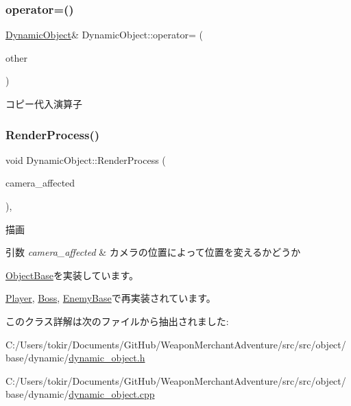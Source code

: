 \subsubsection{\texorpdfstring{operator=()}{operator=()}}
{\footnotesize\ttfamily \mbox{\hyperlink{class_dynamic_object}{Dynamic\+Object}}\& Dynamic\+Object\+::operator= (\begin{DoxyParamCaption}\item[{const \mbox{\hyperlink{class_dynamic_object}{Dynamic\+Object}} \&}]{other }\end{DoxyParamCaption})\hspace{0.3cm}{\ttfamily [inline]}}



コピー代入演算子 

\mbox{\label{class_dynamic_object_aa7488e1b4dfd7049447535d93d9d6783}} 
\subsubsection{\texorpdfstring{Render\+Process()}{RenderProcess()}}
{\footnotesize\ttfamily void Dynamic\+Object\+::\+Render\+Process (\begin{DoxyParamCaption}\item[{bool}]{camera\+\_\+affected }\end{DoxyParamCaption})\hspace{0.3cm}{\ttfamily [protected]}, {\ttfamily [virtual]}}



描画 


\begin{DoxyParams}{引数}
{\em camera\+\_\+affected} & カメラの位置によって位置を変えるかどうか \\
\hline
\end{DoxyParams}


\mbox{\hyperlink{class_object_base_aeac51d868beeb7f7fe900407b76b93a2}{Object\+Base}}を実装しています。



\mbox{\hyperlink{class_player_a8ac2e54fe5672d32186456b9735c02c3}{Player}}, \mbox{\hyperlink{class_boss_a6681bd6fc6dc35e200f9e63f196301af}{Boss}}, \mbox{\hyperlink{class_enemy_base_af874ce6fc410fddc7d55ffd7c7bedac8}{Enemy\+Base}}で再実装されています。



このクラス詳解は次のファイルから抽出されました\+:\begin{DoxyCompactItemize}
\item 
C\+:/\+Users/tokir/\+Documents/\+Git\+Hub/\+Weapon\+Merchant\+Adventure/src/src/object/base/dynamic/\mbox{\hyperlink{dynamic__object_8h}{dynamic\+\_\+object.\+h}}\item 
C\+:/\+Users/tokir/\+Documents/\+Git\+Hub/\+Weapon\+Merchant\+Adventure/src/src/object/base/dynamic/\mbox{\hyperlink{dynamic__object_8cpp}{dynamic\+\_\+object.\+cpp}}\end{DoxyCompactItemize}
